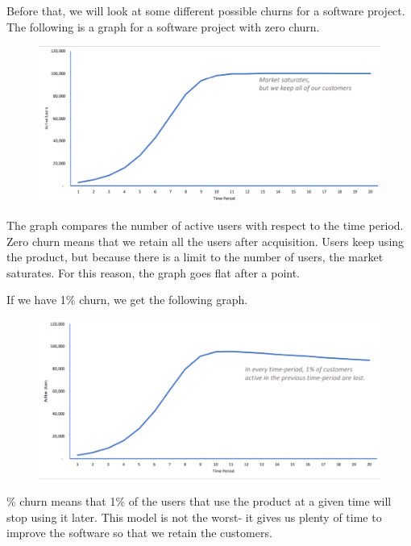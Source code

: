 \documentclass[a4paper, openany]{memoir}
\begin{document}
Before that, we will look at some different possible churns for a software project. The following is a graph for a software project with zero churn.
\begin{figure}[H]
    \centering
    \includegraphics[scale=0.55]{src/18.11 0 Churn.PNG}
\end{figure}
\noindent The graph compares the number of active users with respect to the time period. Zero churn means that we retain all the users after acquisition. Users keep using the product, but because there is a limit to the number of users, the market saturates. For this reason, the graph goes flat after a point.

If we have 1\% churn, we get the following graph.
\begin{figure}[H]
    \centering
    \includegraphics[scale=0.55]{src/18.12 1 Churn.PNG}
\end{figure}
\% churn means that 1\% of the users that use the product at a given time will stop using it later. This model is not the worst- it gives us plenty of time to improve the software so that we retain the customers.
\end{document}
